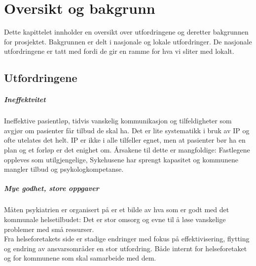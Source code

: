 \documentclass[11pt]{report} %
\begin{document}
              \renewcommand{\chaptername}{Del}
              \renewcommand{\contentsname}{Innhold}
              \renewcommand\listfigurename{Illustrasjoner}
              \renewcommand\tablename{Tabell}
		          \renewcommand\listtablename{Tabeller}
              \renewcommand{\figurename}{Illustrasjon}
              \renewcommand{\bibname}{Kilder:}

              \tableofcontents

              \chapter{Oversikt og bakgrunn}\label{chap:ov}
                Dette kapittelet innholder en oversikt over utfordringene og deretter bakgrunnen for prosjektet. Bakgrunnen er delt i nasjonale og lokale utfordringer. De nasjonale utfordringene er tatt med fordi de gir en ramme for hva vi sliter med lokalt.
                \section{Utfordringene}\label{sec:ov_utf}
                  \paragraph{Ineffektvitet\\}
                   Ineffektive pasientløp, tidvis vanskelig kommunikasjon og tilfeldigheter som avgjør om pasienter får tilbud de skal ha. Det er lite systematikk i bruk av IP og ofte utelates det helt. IP er ikke i alle tilfeller egnet, men at pasienter bør ha en plan og et forløp er det enighet om. Årsakene til dette er mangfoldige: Fastlegene oppleves som utilgjengelige, Sykehusene har sprengt kapasitet og kommunene mangler tilbud og psykologkompetanse. \\
                  \paragraph{Mye godhet, store oppgaver\\}
                    Måten psykiatrien er organisert på er et bilde av hva som er godt med det kommunale helsetilbudet: Det er stor omsorg og evne til å løse vanskelige problemer med små ressurser\label{stor_vilje_til_hjelp}.\\
                    Fra helseforetakets side er stadige endringer med fokus på effektivisering, flytting og endring av ansvarsområder en stor utfordring. Både internt for helseforetaket og for kommunene som skal samarbeide med dem.\\
\end{document}
